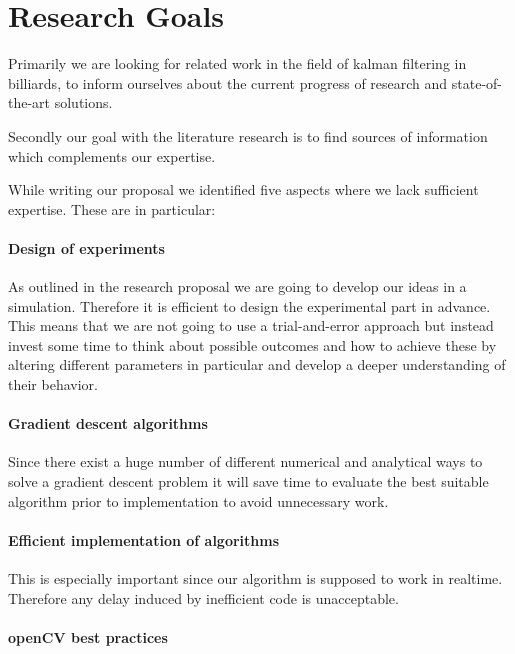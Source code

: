 \documentclass[titlepage, a4paper, 11pt]{scrartcl}
\begin{document}
\section{Research Goals}

Primarily we are looking for related work in the field of kalman filtering in billiards, to inform ourselves about the current progress of research and state-of-the-art solutions.

Secondly our goal with the literature research is to find sources of information which complements our expertise. 

While writing our proposal we identified five aspects where we lack sufficient expertise.
These are in particular:

\paragraph{Design of experiments}

As outlined in the research proposal we are going to develop our ideas in a simulation. Therefore it is efficient to design the experimental part in advance.
This means that we are not going to use a trial-and-error approach but instead invest some time to think about possible outcomes and how to achieve these by 
altering different parameters in particular and develop a deeper understanding of their behavior.

\paragraph{Gradient descent algorithms}

Since there exist a huge number of different numerical and analytical ways to solve a gradient descent problem it will save time to evaluate the best
suitable algorithm prior to implementation to avoid unnecessary work.

\paragraph{Efficient implementation of algorithms}

This is especially important since our algorithm is supposed to work in realtime.
Therefore any delay induced by inefficient code is unacceptable.

\paragraph{openCV best practices}
\end{document}

